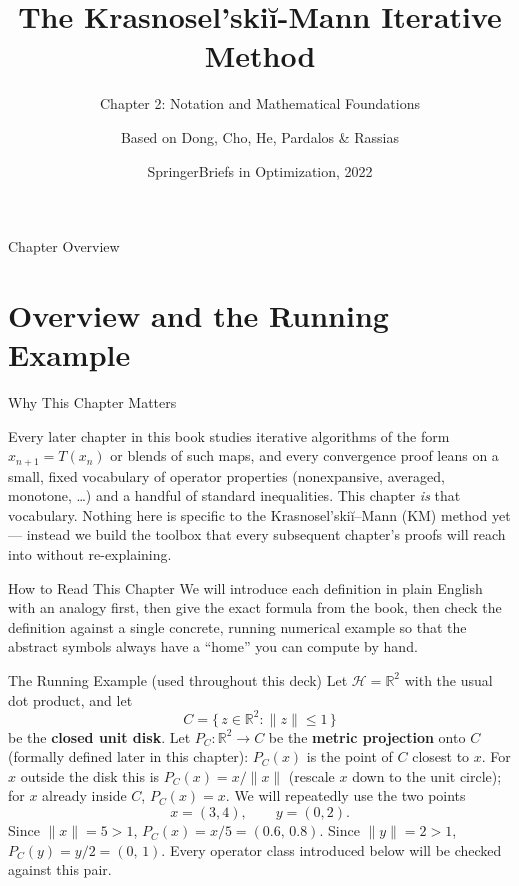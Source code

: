 \documentclass[aspectratio=169,10pt]{beamer}
\title[KM Method -- Ch.2]{The Krasnosel'ski\u{i}-Mann Iterative Method}
\subtitle{Chapter 2: Notation and Mathematical Foundations}
\author{Based on Dong, Cho, He, Pardalos \& Rassias}
\date{SpringerBriefs in Optimization, 2022}
\newcommand{\R}{\mathbb{R}}
\begin{document}
\begin{frame}
  \titlepage
\end{frame}

\begin{frame}{Chapter Overview}
  \tableofcontents
\end{frame}


\section{Overview and the Running Example}

\begin{frame}[allowframebreaks]{Why This Chapter Matters}

Every later chapter in this book studies iterative algorithms of the form
$x_{n+1} = T(x_n)$ or blends of such maps, and every convergence proof leans on
a small, fixed vocabulary of operator properties (nonexpansive, averaged,
monotone, \ldots) and a handful of standard inequalities. This chapter
\emph{is} that vocabulary. Nothing here is specific to the
Krasnosel'ski\u{i}--Mann (KM) method yet --- instead we build the toolbox that
every subsequent chapter's proofs will reach into without re-explaining.

  \begin{block}{How to Read This Chapter}
    We will introduce each definition in plain English with an analogy first,
    then give the exact formula from the book, then check the definition
    against a single concrete, running numerical example so that the abstract
    symbols always have a ``home'' you can compute by hand.
  \end{block}

  \begin{alertblock}{The Running Example (used throughout this deck)}
    Let $\mathcal{H} = \R^2$ with the usual dot product, and let
    \[
      C = \{\, z \in \R^2 : \|z\| \le 1 \,\}
    \]
    be the \textbf{closed unit disk}. Let $P_C : \R^2 \to C$ be the
    \textbf{metric projection} onto $C$ (formally defined later in this
    chapter): $P_C(x)$ is the point of $C$ closest to $x$. For $x$ outside the
    disk this is $P_C(x) = x/\|x\|$ (rescale $x$ down to the unit circle); for
    $x$ already inside $C$, $P_C(x) = x$. We will repeatedly use the two
    points
    \[
      x = (3, 4), \qquad y = (0, 2).
    \]
    Since $\|x\| = 5 > 1$, $P_C(x) = x/5 = (0.6,\, 0.8)$.
    Since $\|y\| = 2 > 1$, $P_C(y) = y/2 = (0,\, 1)$.
    Every operator class introduced below will be checked against this pair.
  \end{alertblock}

\end{frame}
\end{document}
